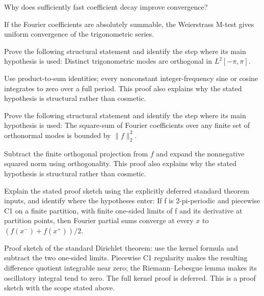 \begin{problem}\label{prob:iii09-problem-08}
Why does sufficiently fast coefficient decay improve convergence?
\end{problem}
\begin{solution}
If the Fourier coefficients are absolutely summable, the Weierstrass
M-test gives uniform convergence of the trigonometric series.
\end{solution}

\begin{problem}\label{prob:iii09-problem-09}
Prove the following structural statement and identify the step where its main hypothesis is used: Distinct trigonometric modes are orthogonal in $L^2[-\pi,\pi]$.
\end{problem}
\begin{solution}
Use product-to-sum identities; every nonconstant integer-frequency sine or cosine integrates to zero over a full period. This proof also explains why the stated hypothesis is structural rather than cosmetic.
\end{solution}

\begin{problem}\label{prob:iii09-problem-10}
Prove the following structural statement and identify the step where its main hypothesis is used: The square-sum of Fourier coefficients over any finite set of orthonormal modes is bounded by $\|f\|_2^2$.
\end{problem}
\begin{solution}
Subtract the finite orthogonal projection from $f$ and expand the nonnegative squared norm using orthogonality. This proof also explains why the stated hypothesis is structural rather than cosmetic.
\end{solution}

\begin{problem}\label{prob:iii09-problem-11}
Explain the stated proof sketch using the explicitly deferred standard theorem inputs, and identify where the hypotheses enter: If f is 2-pi-periodic and piecewise C1 on a finite partition, with finite one-sided limits of f and its derivative at partition points, then Fourier partial sums converge at every $x$ to $(f(x^-)+f(x^+))/2$.
\end{problem}
\begin{solution}
Proof sketch of the standard Dirichlet theorem: use the kernel formula and subtract the two one-sided limits. Piecewise C1 regularity makes the resulting difference quotient integrable near zero; the Riemann--Lebesgue lemma makes its oscillatory integral tend to zero. The full kernel proof is deferred. This is a proof sketch with the scope stated above.
\end{solution}

